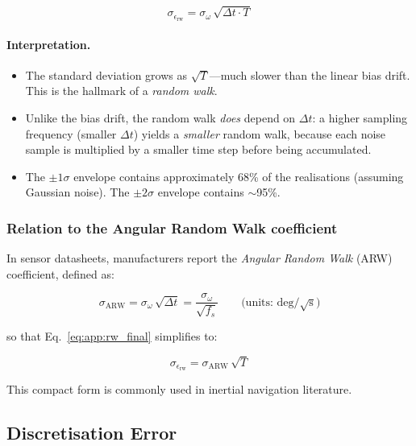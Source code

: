 \begin{equation}
  \boxed{\;\sigma_{\epsilon_\text{rw}}
  = \sigma_\omega\,\sqrt{\Delta t \cdot T}\;}
  \label{eq:app:rw_final}
\end{equation}

\paragraph{Interpretation.}
\begin{itemize}
  \item The standard deviation grows as $\sqrt{T}$---much slower than the
        linear bias drift. This is the hallmark of a \emph{random walk}.
  \item Unlike the bias drift, the random walk \emph{does} depend on
        $\Delta t$: a higher sampling frequency (smaller $\Delta t$) yields a
        \emph{smaller} random walk, because each noise sample is multiplied by
        a smaller time step before being accumulated.
  \item The $\pm 1\sigma$ envelope contains approximately 68\% of the
        realisations (assuming Gaussian noise). The $\pm 2\sigma$ envelope
        contains $\sim$95\%.
\end{itemize}

\subsubsection{Relation to the Angular Random Walk coefficient}

In sensor datasheets, manufacturers report the \emph{Angular Random Walk}
(ARW) coefficient, defined as:

\begin{equation}
  \sigma_\text{ARW} = \sigma_\omega\,\sqrt{\Delta t}
  = \frac{\sigma_\omega}{\sqrt{f_s}}
  \qquad \text{(units: deg/}\sqrt{\text{s}}\text{)}
  \label{eq:app:arw_def}
\end{equation}

\noindent so that Eq.~\eqref{eq:app:rw_final} simplifies to:

\begin{equation}
  \sigma_{\epsilon_\text{rw}} = \sigma_\text{ARW}\,\sqrt{T}
  \label{eq:app:arw_simple}
\end{equation}

\noindent This compact form is commonly used in inertial navigation literature.

\subsection{Discretisation Error}
\label{app:disc}

